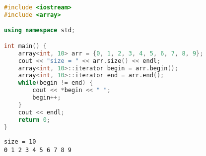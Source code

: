 \begin{table}[H]
	\centering
	\caption{array成员函数}
\end{table}


\begin{lstlisting}[language=C++]
#include <iostream>
#include <array>

using namespace std;

int main() {
    array<int, 10> arr = {0, 1, 2, 3, 4, 5, 6, 7, 8, 9};
    cout << "size = " << arr.size() << endl;
    array<int, 10>::iterator begin = arr.begin();
    array<int, 10>::iterator end = arr.end();
    while(begin != end) {
        cout << *begin << " ";
        begin++;
    }
    cout << endl;
    return 0;
}
\end{lstlisting}

\begin{tcolorbox}
	\begin{verbatim}
size = 10
0 1 2 3 4 5 6 7 8 9
	\end{verbatim}
\end{tcolorbox}

\vspace{0.5cm}

